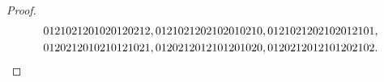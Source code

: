 \documentclass[10pt,a4paper]{amsart}
\begin{document}
\begin{proof}
    \begin{align*}
        &\textbf{0}12102\textbf{1}20102\textbf{0}12021\textbf{2}, \textbf{0}12102\textbf{1}20210\textbf{2}01021\textbf{0},
    \textbf{0}12102\textbf{1}20210\textbf{2}01210\textbf{1},\\
        &\textbf{0}12021\textbf{2}01021\textbf{0}12102\textbf{1},
    \textbf{0}12021\textbf{2}01210\textbf{1}20102\textbf{0},
    \textbf{0}12021\textbf{2}01210\textbf{1}20210\textbf{2}. \qedhere
    \end{align*}
\end{proof}
\end{document}

